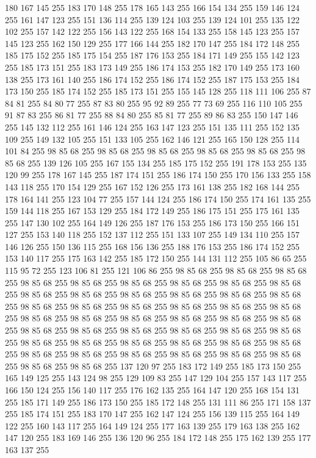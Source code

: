 180 167 145 255 183 170 148 255 178 165 143 255 166 154 134 255 159 146 124 255 161 147 123 255 151 136 114 255 139 124 103 255 139 124 101 255 135 122 102 255 157 142 122 255 156 143 122 255 168 154 133 255 158 145 123 255 157 145 123 255 162 150 129 255 177 166 144 255 182 170 147 255 184 172 148 255 185 175 152 255 185 175 154 255 187 176 153 255 184 171 149 255 155 142 123 255 185 173 151 255 183 173 149 255 186 174 153 255 182 170 149 255 173 160 138 255 173 161 140 255 186 174 152 255 186 174 152 255 187 175 153 255 184 173 150 255 185 174 152 255 185 173 151 255 155 145 128 255 118 111 106 255 87 84 81 255 84 80 77 255 87 83 80 255 95 92 89 255 77 73 69 255 116 110 105 255 91 87 83 255 86 81 77 255 88 84 80 255 85 81 77 255 89 86 83 255 150 147 146 255 145 132 112 255 161 146 124 255 163 147 123 255 151 135 111 255 152 135 109 255 149 132 105 255 151 133 105 255 162 146 121 255 165 150 128 255 114 101 84 255 98 85 68 255 98 85 68 255 98 85 68 255 98 85 68 255
98 85 68 255 98 85 68 255 139 126 105 255 167 155 134 255 185 175 152 255 191 178 153 255 135 120 99 255 178 167 145 255 187 174 151 255 186 174 150 255 170 156 133 255 158 143 118 255 170 154 129 255 167 152 126 255 173 161 138 255 182 168 144 255 178 164 141 255 123 104 77 255 157 144 124 255 186 174 150 255 174 161 135 255 159 144 118 255 167 153 129 255 184 172 149 255 186 175 151 255 175 161 135 255 147 130 102 255 164 149 126 255 187 176 153 255 186 173 150 255 166 151 127 255 153 140 118 255 152 137 112 255 151 133 107 255 149 134 110 255 157 146 126 255 150 136 115 255 168 156 136 255 188 176 153 255 186 174 152 255 153 140 117 255 175 163 142 255 185 172 150 255 144 131 112 255 105 86 65 255 115 95 72 255 123 106 81 255 121 106 86 255 98 85 68 255 98 85 68 255 98 85 68 255 98 85 68 255 98 85 68 255 98 85 68 255 98 85 68 255 98 85 68 255 98 85 68 255 98 85 68 255 98 85 68 255 98 85 68 255 98 85 68 255 98 85 68 255 98 85 68 255 98 85 68 255
98 85 68 255 98 85 68 255 98 85 68 255 98 85 68 255 98 85 68 255 98 85 68 255 98 85 68 255 98 85 68 255 98 85 68 255 98 85 68 255 98 85 68 255 98 85 68 255 98 85 68 255 98 85 68 255 98 85 68 255 98 85 68 255 98 85 68 255 98 85 68 255 98 85 68 255 98 85 68 255 98 85 68 255 98 85 68 255 98 85 68 255 98 85 68 255 98 85 68 255 98 85 68 255 98 85 68 255 98 85 68 255 98 85 68 255 98 85 68 255 98 85 68 255 137 120 97 255 183 172 149 255 185 173 150 255 165 149 125 255 143 124 98 255 129 109 83 255 147 129 104 255 157 143 117 255 166 150 124 255 156 140 117 255 176 162 135 255 164 147 120 255 168 154 131 255 185 171 149 255 186 173 150 255 185 172 148 255 131 111 86 255 171 158 137 255 185 174 151 255 183 170 147 255 162 147 124 255 156 139 115 255 164 149 122 255 160 143 117 255 164 149 124 255 177 163 139 255 179 163 138 255 162 147 120 255 183 169 146 255 136 120 96 255 184 172 148 255 175 162 139 255 177 163 137 255
